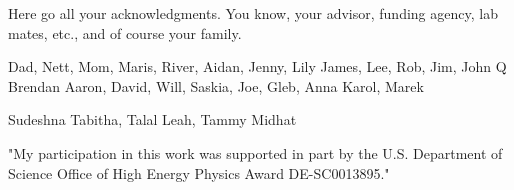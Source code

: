 
Here go all your acknowledgments. You know, your advisor, funding agency, lab
mates, etc., and of course your family.



Dad, Nett, Mom, Maris, River, Aidan, Jenny, Lily
James, Lee, Rob, Jim, John Q
Brendan
Aaron, David, Will, Saskia, Joe, Gleb, Anna
Karol, Marek


Sudeshna
Tabitha, Talal
Leah, Tammy
Midhat



"My participation in this work was supported in part by the U.S. Department of Science Office of High Energy Physics Award DE-SC0013895."
